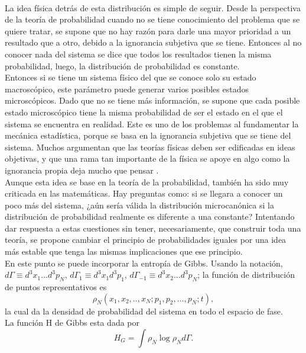 \\
La idea física detrás de esta distribución es simple de seguir. Desde la perspectiva de la teoría de probabilidad cuando no se tiene conocimiento del problema que se quiere tratar, se supone que no hay razón para darle una mayor prioridad a un resultado que a otro, debido a la ignorancia subjetiva que se tiene. Entonces al no conocer nada del sistema se dice que todos los resultados tienen la misma probabilidad, luego, la distribución de probabilidad es constante.
\\
Entonces si se tiene un sistema físico del que se conoce solo su estado macroscópico, este parámetro puede generar varios posibles estados microscópicos. Dado que no se tiene más información, se supone que cada posible estado microscópico tiene la misma probabilidad de ser el estado en el que el sistema se encuentra en realidad. Este es uno de los problemas al fundamentar la mecánica estadística, porque se basa en la ignorancia subjetiva que se tiene del sistema. Muchos argumentan que las teorías físicas deben ser edificadas en ideas objetivas, y que una rama tan importante de la física se apoye en algo como la ignorancia propia deja mucho que pensar \cite{Penrose}.
\\
Aunque esta idea se base en la teoría de la probabilidad, también ha sido muy criticada en las matemáticas. Hay preguntas como: si se llegara a conocer un poco más del sistema, ¿aún sería válida la distribución microcanónica si la distribución de probabilidad realmente es diferente a una constante? Intentando dar respuesta a estas cuestiones sin tener, necesariamente, que construir toda una teoría, se propone cambiar el principio de probabilidades iguales por una idea más estable que tenga las mismas implicaciones que ese principio.
\\
En este punto se puede incorporar la entropía de Gibbs. Usando la notación, $d\Gamma \equiv d^{3}x_{1}...d^{3}p_{N}$, $d\Gamma_{1} \equiv d^{3}x_{1}d^{3}p_{1}$, $d\Gamma_{-1} \equiv d^{3}x_{2}...d^{3}p_{N}$; la función de distribución de puntos representativos es
\begin{equation}
\rho_{N}(x_{1},x_{2},..,x_{N};p_{1},p_{2},...,p_{N};t),
\end{equation}
la cual da la densidad de probabilidad del sistema en todo el espacio de fase. 
\\
La función H de Gibbs esta dada por
\begin{equation}
H_{G}= \int \rho_{N} \log \rho_{N} d \Gamma.
\end{equation}
